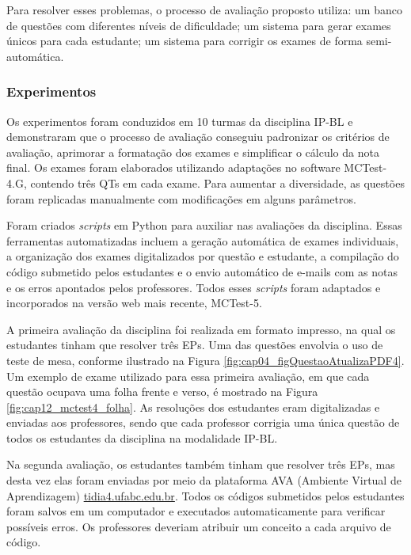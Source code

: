 Para resolver esses problemas, o processo de avaliação proposto utiliza: um banco de questões com diferentes níveis de dificuldade; um sistema para gerar exames únicos para cada estudante; um sistema para corrigir os exames de forma semi-automática.

\subsubsection{Experimentos}

Os experimentos foram conduzidos em 10 turmas da disciplina IP-BL e demonstraram que o processo de avaliação conseguiu padronizar os critérios de avaliação, aprimorar a formatação dos exames e simplificar o cálculo da nota final. Os exames foram elaborados utilizando adaptações no software MCTest-4.G, contendo três QTs em cada exame. Para aumentar a diversidade, as questões foram replicadas manualmente com modificações em alguns parâmetros.

Foram criados \textit{scripts} em Python para auxiliar nas avaliações da disciplina. Essas ferramentas automatizadas incluem a geração automática de exames individuais, a organização dos exames digitalizados por questão e estudante, a compilação do código submetido pelos estudantes e o envio automático de e-mails com as notas e os erros apontados pelos professores. Todos esses \textit{scripts} foram adaptados e incorporados na versão web mais recente, MCTest-5.

A primeira avaliação da disciplina foi realizada em formato impresso, na qual os estudantes tinham que resolver três EPs. Uma das questões envolvia o uso de teste de mesa, conforme ilustrado na Figura \ref{fig:cap04_figQuestaoAtualizaPDF4}. Um exemplo de exame utilizado para essa primeira avaliação, em que cada questão ocupava uma folha frente e verso, é mostrado na Figura \ref{fig:cap12_mctest4_folha}. As resoluções dos estudantes eram digitalizadas e enviadas aos professores, sendo que cada professor corrigia uma única questão de todos os estudantes da disciplina na modalidade IP-BL.

Na segunda avaliação, os estudantes também tinham que resolver três EPs, mas desta vez elas foram enviadas por meio da plataforma AVA (Ambiente Virtual de Aprendizagem) \href{http://tidia4.ufabc.edu.br/portal}{tidia4.ufabc.edu.br}. Todos os códigos submetidos pelos estudantes foram salvos em um computador e executados automaticamente para verificar possíveis erros. Os professores deveriam atribuir um conceito a cada arquivo de código.

